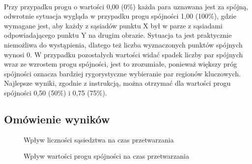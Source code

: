 \documentclass[../main.tex]{subfiles}
\begin{document}
    \paragraph{}
    Przy przypadku progu o wartości 0,00 (0\%) każda para uznawana jest za spójną, odwrotnie sytuacja wygląda w przypadku progu spójności 1,00 (100\%), gdzie wymagane jest, aby każdy z sąsiadów punktu X był w parze z sąsiadami odpowiadającego punktu Y na drugim obrazie. Sytuacja ta jest praktycznie niemożliwa do wystąpienia, dlatego też liczba wyznaczonych punktów spójnych wynosi 0.
    \newline
    W przypadku pozostałych wartości widać spadek liczby par spójnych wraz ze wzrostem progu spójności, jest to zrozumiałe, ponieważ większy próg spójności oznacza bardziej rygorystyczne wybieranie par regionów kluczowych.
    \newline
    Najlepsze wyniki, zgodnie z instrukcją, można otrzymać dla wartości progu spójności 0,50 (50\%) i 0,75 (75\%).
    
    \subsection{Omówienie wyników}
    
    \begin{figure}[H]
        \centering
        \caption{Wpływ liczności sąsiedztwa na czas przetwarzania}
        
        \caption{Wpływ wartości progu spójności na czas przetwarzania}
     
    \end{figure}
\end{document}

